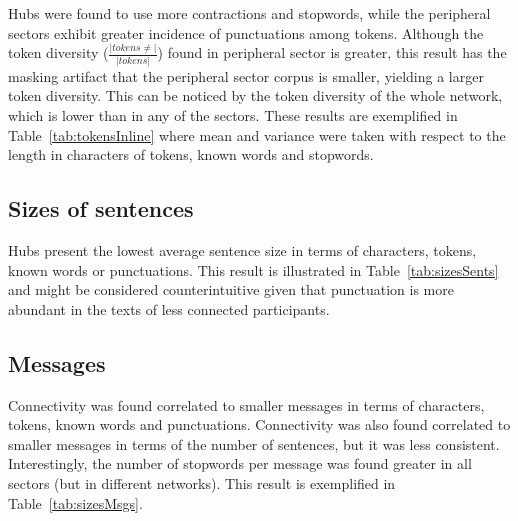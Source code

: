 Hubs were found to use more contractions and stopwords, while the peripheral sectors exhibit greater incidence of punctuations among tokens.
Although the token diversity ($\frac{|tokens \neq|}{|tokens|}$) found in peripheral sector is greater,
this result has the masking artifact that the peripheral sector corpus is smaller, yielding a larger token diversity.
This can be noticed by the token diversity of the whole network, which is lower than in any of the sectors.
These results are exemplified in Table~\ref{tab:tokensInline}
where mean and variance were taken with respect to the length in characters of tokens, known words and stopwords.

\FloatBarrier



%

\subsection{Sizes of sentences}\label{subsec:ss}
Hubs present the lowest average sentence size
in terms of characters, tokens, known words or punctuations.
This result is illustrated in Table~\ref{tab:sizesSents}
and might be considered counterintuitive given that punctuation
is more abundant in the texts of less connected participants.

\FloatBarrier

\subsection{Messages}\label{subsec:mm}
Connectivity was found correlated to smaller messages in terms of characters, tokens, known words and punctuations.
Connectivity was also found correlated to smaller messages in terms of the number of sentences, but
it was less consistent.
Interestingly, the number of stopwords per message was found greater in all sectors (but in different networks).
This result is exemplified in Table~\ref{tab:sizesMsgs}.

\FloatBarrier


